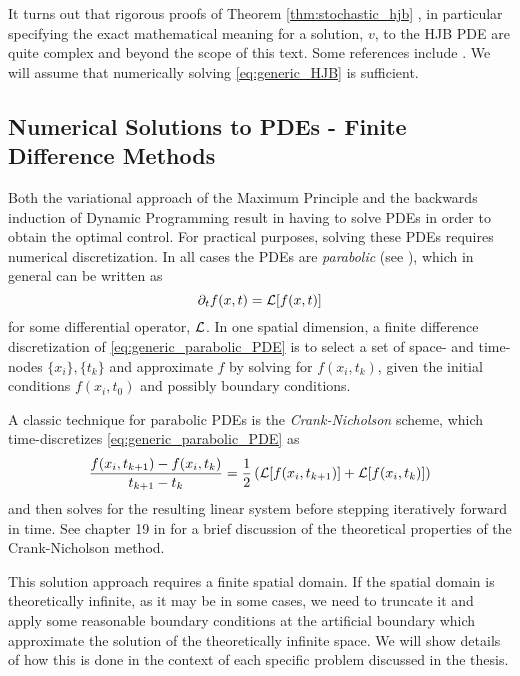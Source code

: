 It turns out that rigorous proofs of Theorem
\ref{thm:stochastic_hjb} , in particular specifying the exact
mathematical meaning for a solution, $v$, to the HJB PDE are quite complex and beyond the scope
of this text. Some references include \cite{Krylov2008,Fleming2006}. We will
assume that numerically solving \cref{eq:generic_HJB} is sufficient. 

\subsection{Numerical Solutions to PDEs - Finite Difference Methods}
Both the variational approach of the Maximum Principle and the backwards
induction of Dynamic Programming result in having to solve PDEs in order to
obtain the optimal control. For practical purposes, solving these PDEs requires
numerical discretization. In all cases the PDEs are {\sl
parabolic} (see \cite{Press1992}), which in general can be written as 
\begin{equation}
{\partial}_t f(x,t) = { \mathcal{L} }[f(x,t)]
\label{eq:generic_parabolic_PDE}
\end{equation}
for some differential operator, ${ \mathcal{L} }$. 
In one spatial dimension, a finite difference discretization of
\cref{eq:generic_parabolic_PDE} is to select a set of space- and time- nodes
$\{x_i\}, \{t_k\}$ and approximate $f$ by solving for $f(x_i, t_k)$, given the
initial conditions $f(x_i, t_0)$ and possibly boundary conditions.

A classic technique for parabolic PDEs is the
{\sl Crank-Nicholson} scheme, which time-discretizes
\cref{eq:generic_parabolic_PDE} as
$$
\frac{f(x_i, t_{k+1})- f(x_i, t_k)}{ t_{k+1}-t_k}
=
\frac 12 \left({ \mathcal{L} }[f(x_i, t_{k+1}  )] + { \mathcal{L} }[f(x_i, t_k)]
\right)
$$
and then solves for the resulting linear system before stepping
iteratively forward in time. See chapter 19 in \cite{Press1992} for a brief
discussion of the theoretical properties of the Crank-Nicholson method.   

This solution approach requires a finite spatial domain. If the spatial domain
is theoretically infinite, as it may be in some cases, we need to truncate it and
apply some reasonable boundary conditions at the artificial boundary which
approximate the solution of the theoretically infinite space. We will show
details of how this is done in the context of each specific problem
discussed in the thesis.  
 